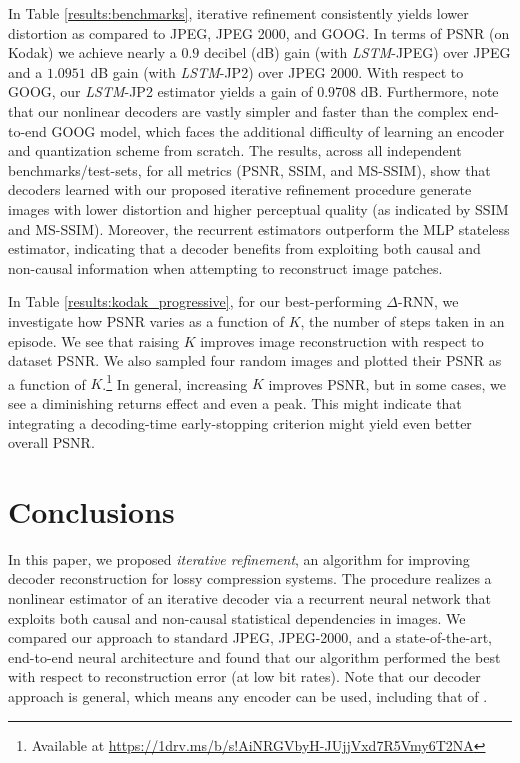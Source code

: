 \documentclass[smallabstract,smallcaptions]{dccpaper}
\begin{document}
In Table \ref{results:benchmarks}, iterative refinement consistently yields lower distortion as compared to JPEG, JPEG 2000, and GOOG. In terms of PSNR (on Kodak) we achieve nearly a $0.9$ decibel (dB) gain (with \emph{LSTM}-JPEG) over JPEG and a $1.0951$ dB gain (with \emph{LSTM}-JP2) over JPEG 2000. With respect to GOOG, our \emph{LSTM}-JP2 estimator yields a gain of $0.9708$ dB. Furthermore, note that our nonlinear decoders are vastly simpler and faster than the complex end-to-end GOOG model, which faces the additional difficulty of learning an encoder and quantization scheme from scratch. The results, across all independent benchmarks/test-sets, for all metrics (PSNR, SSIM, and MS-SSIM), show that decoders learned with our proposed iterative refinement procedure generate images with lower distortion and higher perceptual quality (as indicated by SSIM and MS-SSIM). Moreover, the recurrent estimators outperform the MLP stateless estimator, indicating that a decoder benefits from exploiting both causal and non-causal information when attempting to reconstruct image patches.

In Table \ref{results:kodak_progressive}, for our best-performing $\Delta$-RNN, we investigate how PSNR varies as a function of $K$, the number of steps taken in an episode. We see that raising $K$ improves image reconstruction with respect to dataset PSNR. We also sampled four random images and plotted their PSNR as a function of $K$.\footnote{Available at \url{https://1drv.ms/b/s!AiNRGVbyH-JUjjVxd7R5Vmy6T2NA}} In general, increasing $K$ improves PSNR, but in some cases, we see a diminishing returns effect and even a peak. This might indicate that integrating a decoding-time early-stopping criterion might yield even better overall PSNR.


\section{Conclusions}
In this paper, we proposed \emph{iterative refinement}, an algorithm for improving decoder reconstruction for lossy compression systems. The procedure realizes a nonlinear estimator of an iterative decoder via a recurrent neural network that exploits both causal and non-causal statistical dependencies in images. We compared our approach to standard JPEG, JPEG-2000, and a state-of-the-art, end-to-end neural architecture and found that our algorithm performed the best with respect to reconstruction error (at low bit rates).
Note that our decoder approach is general, which means any encoder can be used, including that of \cite{toderici2016full}. %




\end{document}
